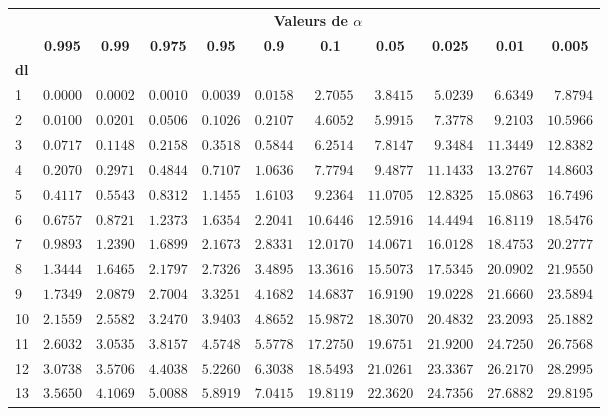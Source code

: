 %
 \begin{center}
 \begin{tabular}{l|rrrrrrrrrr}\hline
& \multicolumn{10}{c}{\bf Valeurs de $\alpha$}\\
&
\multicolumn{1}{c}{\bf 0.995}&
\multicolumn{1}{c}{\bf 0.99}&
\multicolumn{1}{c}{\bf 0.975}&
\multicolumn{1}{c}{\bf 0.95}&
\multicolumn{1}{c}{\bf 0.9}&
\multicolumn{1}{c}{\bf 0.1}&
\multicolumn{1}{c}{\bf 0.05}&
\multicolumn{1}{c}{\bf 0.025}&
\multicolumn{1}{c}{\bf 0.01}&
\multicolumn{1}{c}{\bf 0.005}\\
\hline
{\bf dl}\\
1&$ 0.0000$&$ 0.0002$&$ 0.0010$&$ 0.0039$&$ 0.0158$&$  2.7055$&$  3.8415$&$  5.0239$&$  6.6349$&$  7.8794$\\
2&$ 0.0100$&$ 0.0201$&$ 0.0506$&$ 0.1026$&$ 0.2107$&$  4.6052$&$  5.9915$&$  7.3778$&$  9.2103$&$ 10.5966$\\
3&$ 0.0717$&$ 0.1148$&$ 0.2158$&$ 0.3518$&$ 0.5844$&$  6.2514$&$  7.8147$&$  9.3484$&$ 11.3449$&$ 12.8382$\\
4&$ 0.2070$&$ 0.2971$&$ 0.4844$&$ 0.7107$&$ 1.0636$&$  7.7794$&$  9.4877$&$ 11.1433$&$ 13.2767$&$ 14.8603$\\
5&$ 0.4117$&$ 0.5543$&$ 0.8312$&$ 1.1455$&$ 1.6103$&$  9.2364$&$ 11.0705$&$ 12.8325$&$ 15.0863$&$ 16.7496$\\
6&$ 0.6757$&$ 0.8721$&$ 1.2373$&$ 1.6354$&$ 2.2041$&$ 10.6446$&$ 12.5916$&$ 14.4494$&$ 16.8119$&$ 18.5476$\\
7&$ 0.9893$&$ 1.2390$&$ 1.6899$&$ 2.1673$&$ 2.8331$&$ 12.0170$&$ 14.0671$&$ 16.0128$&$ 18.4753$&$ 20.2777$\\
8&$ 1.3444$&$ 1.6465$&$ 2.1797$&$ 2.7326$&$ 3.4895$&$ 13.3616$&$ 15.5073$&$ 17.5345$&$ 20.0902$&$ 21.9550$\\
9&$ 1.7349$&$ 2.0879$&$ 2.7004$&$ 3.3251$&$ 4.1682$&$ 14.6837$&$ 16.9190$&$ 19.0228$&$ 21.6660$&$ 23.5894$\\
10&$ 2.1559$&$ 2.5582$&$ 3.2470$&$ 3.9403$&$ 4.8652$&$ 15.9872$&$ 18.3070$&$ 20.4832$&$ 23.2093$&$ 25.1882$\\
11&$ 2.6032$&$ 3.0535$&$ 3.8157$&$ 4.5748$&$ 5.5778$&$ 17.2750$&$ 19.6751$&$ 21.9200$&$ 24.7250$&$ 26.7568$\\
12&$ 3.0738$&$ 3.5706$&$ 4.4038$&$ 5.2260$&$ 6.3038$&$ 18.5493$&$ 21.0261$&$ 23.3367$&$ 26.2170$&$ 28.2995$\\
13&$ 3.5650$&$ 4.1069$&$ 5.0088$&$ 5.8919$&$ 7.0415$&$ 19.8119$&$ 22.3620$&$ 24.7356$&$ 27.6882$&$ 29.8195$\\

\end{tabular}
\end{center}
